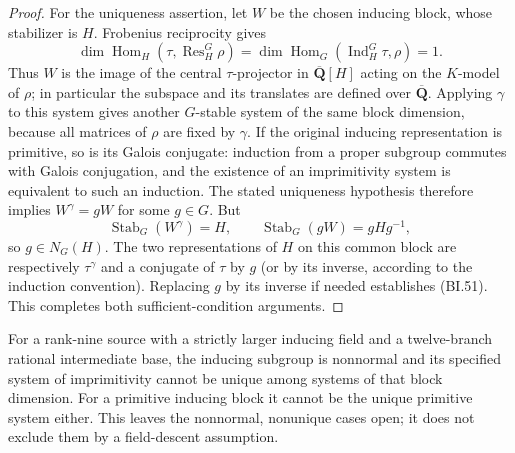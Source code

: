 \begin{proof}
For the uniqueness assertion, let $W$ be the chosen inducing
block, whose stabilizer is $H$.  Frobenius reciprocity gives
\[
 \dim\operatorname{Hom}_H(\tau,\operatorname{Res}_H^G\rho)
 =\dim\operatorname{Hom}_G(\operatorname{Ind}_H^G\tau,\rho)=1.
\]
Thus $W$ is the image of the central $\tau$-projector in
$\overline{\mathbf Q}[H]$ acting on the $K$-model of $\rho$;
in particular the subspace and its translates are defined over
$\overline{\mathbf Q}$.  Applying $\gamma$ to this system gives
another $G$-stable system of the same block dimension, because
all matrices of $\rho$ are fixed by $\gamma$.  If the original
inducing representation is primitive, so is its Galois conjugate:
induction from a proper subgroup commutes with Galois conjugation,
and the existence of an imprimitivity system is equivalent to
such an induction.  The stated uniqueness hypothesis therefore
implies $W^\gamma=gW$ for some $g\in G$.
But
\[
 \operatorname{Stab}_G(W^\gamma)=H,
 \qquad\operatorname{Stab}_G(gW)=gHg^{-1},
\]
so $g\in N_G(H)$.  The two representations of $H$ on this
common block are respectively $\tau^\gamma$ and a conjugate of
$\tau$ by $g$ (or by its inverse, according to the induction
convention).  Replacing $g$ by its inverse if needed establishes
(BI.51).  This completes both sufficient-condition arguments.
\end{proof}

\begin{corollary}
For a rank-nine source with a strictly larger inducing field and
a twelve-branch rational intermediate base, the inducing subgroup
is nonnormal and its specified system of imprimitivity cannot be
unique among systems of that block dimension.  For a primitive
inducing block it cannot be the unique primitive system either.
This leaves the nonnormal, nonunique cases open; it does not
exclude them by a field-descent assumption.
\end{corollary}
